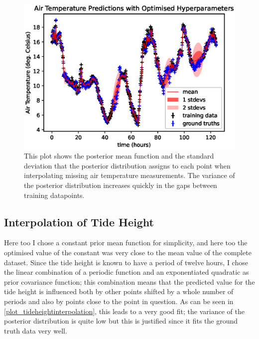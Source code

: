 \documentclass{article}
\begin{document}
                \begin{figure}
                    \includegraphics[width=\linewidth,height=\textheight,keepaspectratio]{air_temp_interpolation.eps}
                    \caption{This plot shows the posterior mean function and the standard deviation that the posterior distribution assigns to each point when interpolating missing air temperature measurements. The variance of the posterior distribution increases quickly in the gaps between training datapoints.}
                    \label{plot_airtempinterpolation}
                \end{figure}

            \FloatBarrier
            \subsection{Interpolation of Tide Height}

                Here too I chose a constant prior mean function for simplicity, and here too the optimised value of the constant was very close to the mean value of the complete dataset. Since the tide height is known to have a period of twelve hours, I chose the linear combination of a periodic function and an exponentiated quadratic as prior covariance function; this combination means that the predicted value for the tide height is influenced both by other points shifted by a whole number of periods and also by points close to the point in question. As can be seen in \cref{plot_tideheightinterpolation}, this leads to a very good fit; the variance of the posterior distribution is quite low but this is justified since it fits the ground truth data very well.
\end{document}
